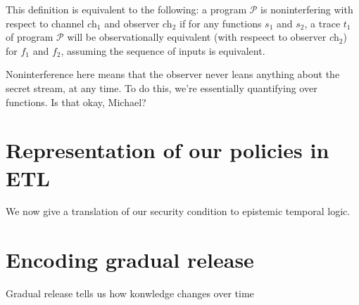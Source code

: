 \documentclass[conference]{IEEEtran}
\theoremstyle{definition}
\newcommand{\sch}{\textit{ch}}
\newcommand{\program}[1]{\ensuremath{\mathcal{#1}}}
\newcommand{\tr}{t}
\begin{document}
This definition is equivalent to the following: a program \program{P}
is noninterfering with respect to channel $\sch_1$ and observer
$\sch_2$ if for any functions $s_1$ and $s_2$, a trace $\tr_1$ of
program \program{P} will be observationally equivalent (with respeect
to observer $\sch_2$) for $f_1$ and $f_2$, assuming the sequence of
inputs is equivalent.

Noninterference here means that the observer never leans anything
about the secret stream, at any time.  To do this, we're essentially
quantifying over functions.  Is that okay, Michael?

\section{Representation of our policies in ETL}
\label{sec:etl-translation}

We now give a translation of our security condition to epistemic
temporal logic.

\section{Encoding gradual release}
\label{sec:etl-translation}

Gradual release tells us how konwledge changes over time
\end{document}
